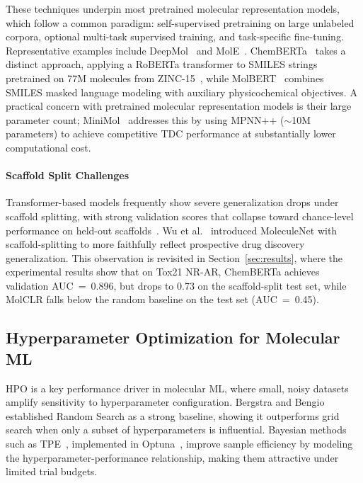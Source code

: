 \documentclass[journal]{IEEEtran}
\begin{document}
These techniques underpin most pretrained molecular representation models, which follow a common paradigm: self-supervised pretraining on large unlabeled corpora, optional multi-task supervised training, and task-specific fine-tuning. Representative examples include DeepMol~\cite{deepMol} and MolE~\cite{molE}. ChemBERTa~\cite{chemberta2} takes a distinct approach, applying a RoBERTa transformer to SMILES strings pretrained on 77M molecules from ZINC-15~\cite{sterling2015zinc15}, while MolBERT~\cite{molbert} combines SMILES masked language modeling with auxiliary physicochemical objectives. A practical concern with pretrained molecular representation models is their large parameter count; MiniMol~\cite{miniMol} addresses this by using MPNN++ ($\sim$10M parameters) to achieve competitive TDC performance at substantially lower computational cost.

\paragraph{Scaffold Split Challenges}
Transformer-based models frequently show severe generalization drops under scaffold splitting, with strong validation scores that collapse toward chance-level performance on held-out scaffolds~\cite{yang2019dmpnn,chemberta2}. Wu et al.~\cite{wu2018moleculenet} introduced MoleculeNet with scaffold-splitting to more faithfully reflect prospective drug discovery generalization. This observation is revisited in Section~\ref{sec:results}, where the experimental results show that on Tox21 NR-AR, ChemBERTa achieves validation AUC~=~0.896, but drops to 0.73 on the scaffold-split test set, while MolCLR falls below the random baseline on the test set (AUC~=~0.45).


\subsection{Hyperparameter Optimization for Molecular ML}

HPO is a key performance driver in molecular ML, where small, noisy datasets amplify sensitivity to hyperparameter configuration. Bergstra and Bengio~\cite{bergstra2012random} established Random Search as a strong baseline, showing it outperforms grid search when only a subset of hyperparameters is influential. Bayesian methods such as TPE~\cite{bergstra2011tpe}, implemented in Optuna~\cite{akiba2019optuna}, improve sample efficiency by modeling the hyperparameter-performance relationship, making them attractive under limited trial budgets.
\end{document}
